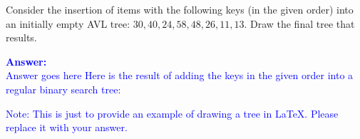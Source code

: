 \item{}
Consider the insertion of items with the following keys (in the given order)
into an initially empty AVL tree: $30,40,24,58,48,26,11,13$. Draw the final tree
that results.\\[12pt]
\ifanswers
\textcolor{blue}{
\textbf{Answer:}\\[6pt]
Answer goes here\parend
Here is the result of adding the keys in the given order into a regular binary
search tree:\\[12pt]
\vskip12pt
Note: This is just to provide an example of drawing a tree in \LaTeX. Please
replace it with your answer.
}
\newpage
\fi
